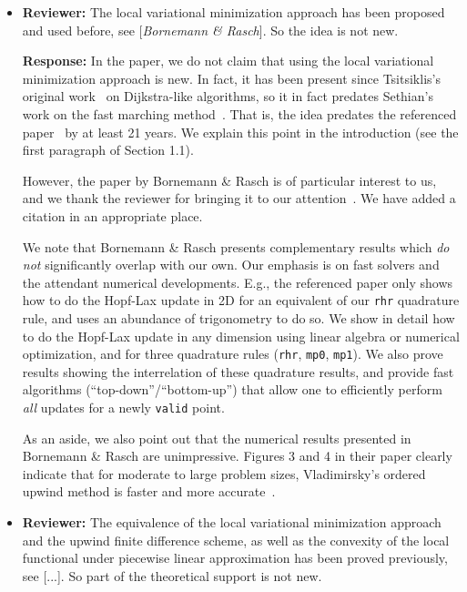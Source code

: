 \documentclass{article}
\begin{document}
\begin{itemize}

\item \textbf{Reviewer:} The local variational minimization approach
  has been proposed and used before, see [\emph{Bornemann \&
    Rasch}]. So the idea is not new.

  \textbf{Response:} In the paper, we do not claim that using the
  local variational minimization approach is new. In fact, it has been
  present since Tsitsiklis's original
  work~\cite{tsitsiklis1995efficient} on Dijkstra-like algorithms, so
  it in fact predates Sethian's work on the fast marching
  method~\cite{sethian1996fast}. That is, the idea predates the
  referenced paper~\cite{bornemann2006finite} by at least 21 years. We
  explain this point in the introduction (see the first paragraph of
  Section 1.1).

  However, the paper by Bornemann \& Rasch is of particular interest
  to us, and we thank the reviewer for bringing it to our
  attention~\cite{bornemann2006finite}. We have added a citation in an
  appropriate place.

  We note that Bornemann \& Rasch presents complementary results which
  \emph{do not} significantly overlap with our own. Our emphasis is on
  fast solvers and the attendant numerical developments. E.g., the
  referenced paper only shows how to do the Hopf-Lax update in 2D for
  an equivalent of our \texttt{rhr} quadrature rule, and uses an
  abundance of trigonometry to do so. We show in detail how to do the
  Hopf-Lax update in any dimension using linear algebra or numerical
  optimization, and for three quadrature rules (\texttt{rhr},
  \texttt{mp0}, \texttt{mp1}). We also prove results showing the
  interrelation of these quadrature results, and provide fast
  algorithms (``top-down''/``bottom-up'') that allow one to
  efficiently perform \emph{all} updates for a newly \texttt{valid}
  point.

  As an aside, we also point out that the numerical results presented
  in Bornemann \& Rasch are unimpressive. Figures 3 and 4 in their
  paper clearly indicate that for moderate to large problem sizes,
  Vladimirsky's ordered upwind method is faster and more
  accurate~\cite{sethian2003ordered}.

\item \textbf{Reviewer:} The equivalence of the local variational
  minimization approach and the upwind finite difference scheme, as
  well as the convexity of the local functional under piecewise linear
  approximation has been proved previously, see [...]. So part of the
  theoretical support is not new.


\end{itemize}
\end{document}
